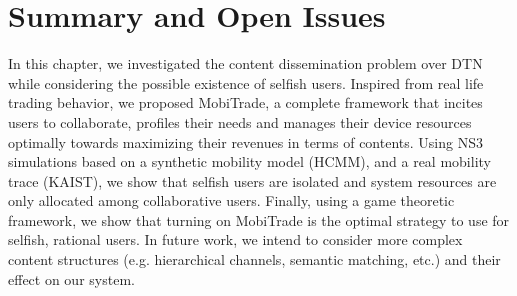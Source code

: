 \section{Summary and Open Issues}

In this chapter, we investigated the content dissemination problem over DTN while considering the possible existence of selfish users.
Inspired from real life trading behavior, we proposed MobiTrade, a complete framework that incites users to collaborate, profiles their needs and manages their device resources optimally towards maximizing their revenues in terms of contents. Using NS3 simulations based on a synthetic mobility model (HCMM), and a real mobility trace (KAIST), we show that selfish users are isolated and system resources are only allocated among collaborative users. Finally, using a game theoretic framework, we show that turning on MobiTrade is the optimal strategy to use for selfish, rational users. In future work, we intend to consider more complex content structures (e.g. hierarchical channels, semantic matching, etc.) and their effect on our system.
